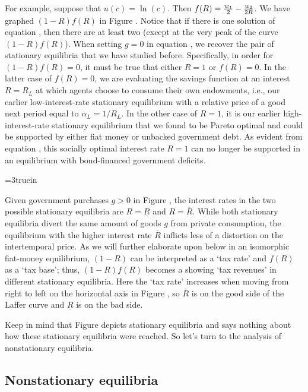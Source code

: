 For example, suppose that $u(c) = \ln(c)$.  Then
$ f(R) = {w_1 \over 2} - {w_2 \over 2 R}$.  
We have graphed $(1-R) f(R)$ in Figure . 
Notice that if there is one solution of equation ,  
then there are at least two (except at the very peak of
the curve $(1-R) f(R)$).
When setting $g=0$ in equation , we recover  
the pair of stationary equilibria that we have studied before. 
Specifically, in order for $(1-R) f(R)=0$, it must be true that 
either $R=1$ or $f(R)=0$. In the latter case of $f(R)=0$, we 
are evaluating the savings function at an interest $R=R_L$ at 
which agents choose to consume their own endowments, i.e., our 
earlier low-interest-rate stationary equilibrium with a relative
price of a good next period equal to $\alpha_L=1/R_L$. 
In the other case of $R=1$, it is our earlier 
high-interest-rate stationary equilibrium that we found
to be Pareto optimal and could be supported by either fiat
money or unbacked government debt. As evident from 
equation , this socially optimal interest rate
$R=1$ can no longer be supported in an equilibrium with
bond-financed government deficits. 

\centerline{\epsfxsize=3truein}
\caption{The Laffer curve in revenues from the inflation tax.}
\endfigure


Given government purchases $g>0$ in 
Figure , the interest rates in the two possible 
stationary equilibria are $R=\underline R$ and $R=\overline R$.
While both stationary equilibria divert the same amount of 
goods $g$ from private consumption, the equilibrium with the 
higher interest rate $\overline R$ inflicts less of a distortion on
the intertemporal price. As we will further elaborate upon 
below in an isomorphic fiat-money equilibrium, $(1-R)$ can be 
interpreted as a `tax rate' and $f(R)$ as a `tax base'; thus, 
$(1-R) f(R)$ becomes a  showing `tax revenues'
in different stationary equilibria. Here the `tax rate' 
increases when moving from right to left on the horizontal axis 
in Figure , so 
$\overline R$ is on the good side of the Laffer curve and 
$\underline R$ is on the bad side.

Keep in mind that Figure  depicts stationary 
equilibria and says nothing about how these stationary
equilibria were reached. So let's turn to the analysis
of nonstationary equilibria.



\subsection{Nonstationary equilibria}

